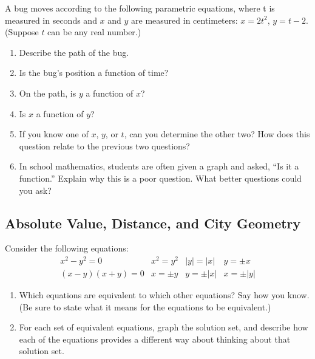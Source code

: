 \begin{prob}
A bug moves according to the following parametric equations, where t is measured in seconds and $x$ and $y$ are measured in centimeters:  $x = 2t^2$, $y = t-2$.  (Suppose $t$ can be any real number.)   
\begin{enumerate}
\item Describe the path of the bug.  
\item Is the bug's position a function of time?  
\item On the path, is $y$ a function of $x$?  
\item Is $x$ a function of $y$?  
\item If you know one of $x$, $y$, or $t$, can you determine the other two?  How does this question relate to the previous two questions?  
\item In school mathematics, students are often given a graph and asked, ``Is it a function.''  Explain why this is a poor question.  What better questions could you ask?  
\end{enumerate}
\end{prob}

\subsection{Absolute Value, Distance, and City Geometry}
\begin{prob}
Consider the following equations:  
\setlength{\arraycolsep}{12pt}
\setlength{\extrarowheight}{3pt}
\[
\begin{array}{cccc}
x^2-y^2=0    &   x^2=y^2   &   |y|=|x|   &   y= \pm x \\
(x-y)(x+y)=0  &   x= \pm y   &   y = \pm|x|   & x = \pm|y|
\end{array}
\]
\begin{enumerate}
\item Which equations are equivalent to which other equations?  Say how you know.  (Be sure to state what it means for the equations to be equivalent.)
\item For each set of equivalent equations, graph the solution set, and describe how each of the equations provides a different way about thinking about that solution set.  
\end{enumerate}
\end{prob}

